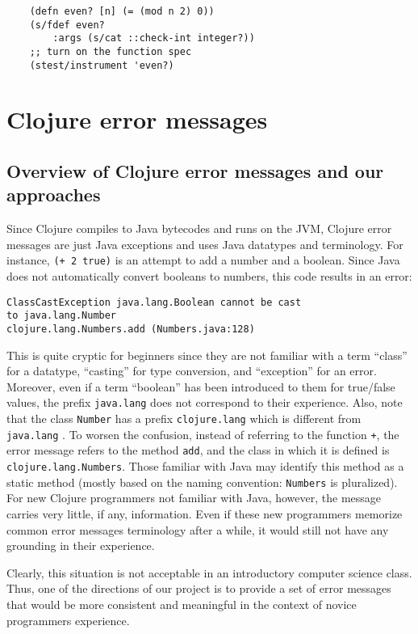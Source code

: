 \documentclass[12pt]{article}
\begin{document}
	\begin{verbatim}
	(defn even? [n] (= (mod n 2) 0))
	(s/fdef even?
    	:args (s/cat ::check-int integer?))
	;; turn on the function spec
	(stest/instrument 'even?)
	\end{verbatim}
	
	


\section{Clojure error messages}
\subsection{Overview of Clojure error messages and our approaches}
Since Clojure compiles to Java bytecodes and runs on the JVM, Clojure error messages are just Java exceptions
and uses Java datatypes and terminology. 
For instance, {\tt (+ 2 true)} is an attempt to add a number and a boolean. 
Since Java does not automatically convert booleans to numbers, this code results in an error:
\begin{verbatim}
ClassCastException java.lang.Boolean cannot be cast 
to java.lang.Number  
clojure.lang.Numbers.add (Numbers.java:128)
\end{verbatim} 
This is quite cryptic for beginners since they are not familiar with a term ``class'' for a datatype,
``casting'' for type conversion, and ``exception'' for an error. Moreover, even if a term ``boolean'' 
has been introduced to them for true/false values, the prefix {\tt  java.lang} does not 
correspond to their experience. Also, note that the class {\tt Number} has a prefix {\tt  clojure.lang}
which is different from {\tt  java.lang} . To worsen the confusion, instead of referring
to the function {\tt +}, the error message refers to the method {\tt add}, and the class 
in which it is defined is {\tt clojure.lang.Numbers}. Those familiar with Java may identify this
method as a static method (mostly based on the naming convention: {\tt Numbers} is pluralized). 
For new Clojure programmers not familiar with Java, however, the message carries very little, if any, information. 
Even if these new programmers memorize common error messages terminology after a while, 
it would still not have any grounding in their experience. 

Clearly, this situation is not acceptable in an introductory computer science class. Thus, one of the directions of our project is to 
provide a set of error messages that would be more consistent and meaningful in the context of 
novice programmers experience. 
\end{document}
